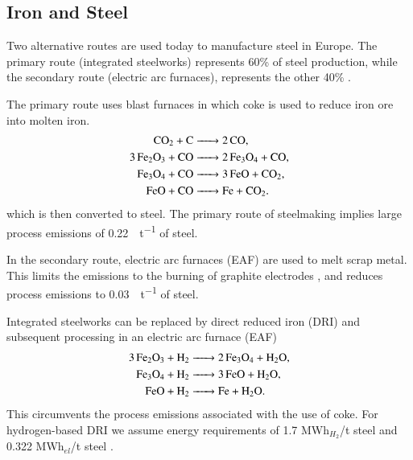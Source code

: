 
\subsection{Iron and Steel}
\label{sec:si:industry:steel}


Two alternative routes are used today to manufacture steel in Europe. The
primary route (integrated steelworks) represents 60\% of steel production, while
the secondary route (electric arc furnaces), represents the other 40\%
.

The primary route uses blast furnaces in which coke is used to reduce iron ore
into molten iron.
\begin{align}
    \ce{CO2 + C &-> 2CO}, \\
    \ce{3Fe2O3 + CO &-> 2Fe3O4 + CO}, \\
    \ce{Fe3O4 + CO &-> 3FeO + CO2}, \\
    \ce{FeO + CO &-> Fe + CO2}.
\end{align}
which is then converted to steel. The primary route of steelmaking implies large
process emissions of \SI{0.22}{\tco\per\tonne} of steel.

In the secondary route, electric arc furnaces (EAF) are used to melt scrap
metal. This limits the \co emissions to the burning of graphite electrodes
, and reduces process emissions to
\SI{0.03}{\tco\per\tonne} of steel.

Integrated steelworks can be replaced by direct reduced iron (DRI) and subsequent processing in an electric arc furnace (EAF)
\begin{align}
    \ce{3Fe2O3 + H2 &-> 2Fe3O4 + H2O}, \\
    \ce{Fe3O4 + H2 &-> 3FeO + H2O}, \\
    \ce{FeO + H2 &-> Fe + H2O}.
\end{align}
This circumvents the process emissions associated with the use of coke. For
hydrogen-based DRI we assume energy requirements of 1.7 MWh$_{H_2}$/t steel
 and 0.322 MWh$_{el}$/t steel
\citeS{}.

